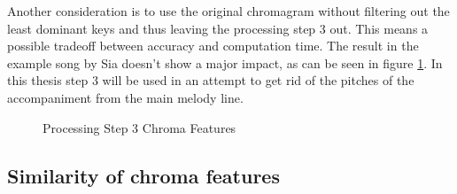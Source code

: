 Another consideration is to use the original chromagram without filtering out the least dominant keys and thus leaving the processing step 3 out. This means a possible tradeoff between accuracy and computation time. The result in the example song by Sia doesn't show a major impact, as can be seen in figure \ref{fig:nomax}. In this thesis step 3 will be used in an attempt to get rid of the pitches of the accompaniment from the main melody line.
\begin{figure}[htbp]
	\centering
	\caption{Processing Step 3 Chroma Features}
	\label{fig:nomax}
\end{figure}

\subsection{Similarity of chroma features}

